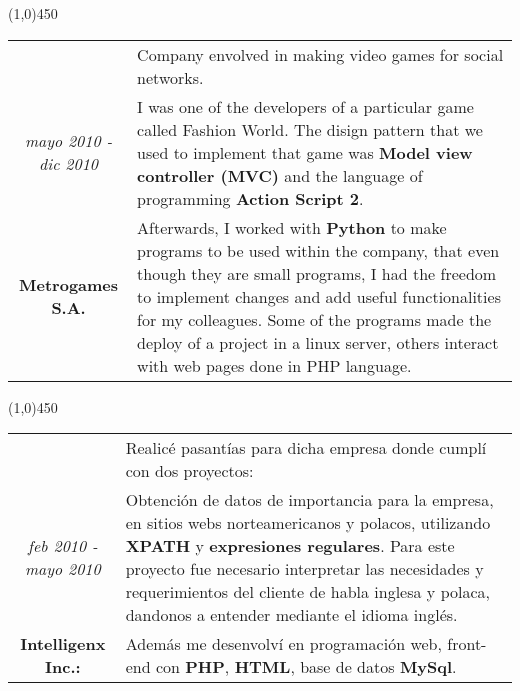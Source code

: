 \begin{center}
\line(1,0){450}
\end{center}
\noindent
\begin{tabular}{c|p{12.5cm}}
& \large Company envolved in making video games for social networks. \\
\large\textit{mayo 2010 - dic 2010} &  \large I was one of the developers of a particular game called Fashion World. The disign pattern that we used to implement that game was \textbf{Model view controller (MVC)} and the language of programming \textbf{Action Script 2}.\\
\large\textbf{Metrogames S.A.} & \large Afterwards, I worked with \textbf{Python} to make programs to be used within the company, that even though they are small programs, I had the freedom to implement changes and add useful functionalities for my colleagues. Some of the programs made the deploy of a project in a linux server, others interact with web pages done in PHP language.
\end{tabular}

\begin{center}
\line(1,0){450}
\end{center}
\noindent
\begin{tabular}{c|p{12.5cm}}
& \large Realicé pasantías para dicha empresa donde cumplí con dos proyectos:\\
\large\textit{feb 2010 - mayo 2010} & \large Obtención de datos de importancia para la empresa, en sitios webs norteamericanos y polacos, utilizando \textbf{XPATH} y \textbf{expresiones regulares}.  Para este proyecto fue necesario interpretar las necesidades y requerimientos del cliente de habla inglesa y polaca, dandonos a entender mediante el idioma inglés.\\
\large\textbf{Intelligenx Inc.:} & \large Además me desenvolví en programación web, front-end con \textbf{PHP}, \textbf{HTML}, base de datos \textbf{MySql}.
\end{tabular}

